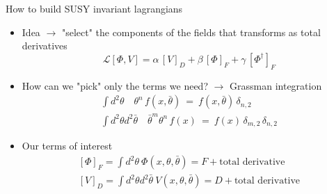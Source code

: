 \documentclass[10pt]{beamer}
\begin{document}
\begin{frame}{How to build SUSY invariant lagrangians}
\begin{itemize}
    \item Idea $\rightarrow$ "select" the components of the fields that transforms as total derivatives
    \begin{equation*} 
        \mathcal{L}[\Phi, V] = \alpha \, \left[V\right]_D + \beta \, \left[\Phi\right]_F  + \gamma \, \left[\Phi^{\dagger}\right]_F
    \end{equation*}
    \item How can we "pick" only the terms we need? $\rightarrow$ Grassman integration
    \begin{gather*}
        \int d^2\theta \quad \theta^n \, f(x, \bar\theta) \ = \ f(x, \bar\theta) \, \delta_{n, 2} \\
        \int d^2\theta d^2\bar\theta \quad \bar\theta^m \theta^n \, f(x)  \ = \ f(x) \, \delta_{m, 2} \, \delta_{n, 2}
    \end{gather*}
    \item Our terms of interest
    \begin{gather*}
        \left[\Phi\right]_F = \int d^2\theta \ \Phi(x, \theta, \bar\theta) = F + \text{total derivative} \\
        \left[V\right]_D = \int d^2\theta d^2\bar\theta \ V(x, \theta, \bar\theta) = D + \text{total derivative}
    \end{gather*}
\end{itemize}
\end{frame}
\end{document}
